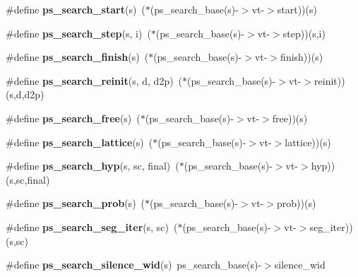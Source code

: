 \begin{DoxyCompactItemize}
\item 
\#define {\bfseries ps\+\_\+search\+\_\+start}(s)~($\ast$(ps\+\_\+search\+\_\+base(s)-\/$>$vt-\/$>$start))(s)\label{pocketsphinx__internal_8h_ac905db8dfa65727e787c44f40d80239c}

\item 
\#define {\bfseries ps\+\_\+search\+\_\+step}(s,  i)~($\ast$(ps\+\_\+search\+\_\+base(s)-\/$>$vt-\/$>$step))(s,i)\label{pocketsphinx__internal_8h_a3e3be8540f1e419fe4dfa1a063c4e8be}

\item 
\#define {\bfseries ps\+\_\+search\+\_\+finish}(s)~($\ast$(ps\+\_\+search\+\_\+base(s)-\/$>$vt-\/$>$finish))(s)\label{pocketsphinx__internal_8h_a52d4cf988efa2211c86a2168de346032}

\item 
\#define {\bfseries ps\+\_\+search\+\_\+reinit}(s,  d,  d2p)~($\ast$(ps\+\_\+search\+\_\+base(s)-\/$>$vt-\/$>$reinit))(s,d,d2p)\label{pocketsphinx__internal_8h_a071483ece6369091cc50334f5be1124b}

\item 
\#define {\bfseries ps\+\_\+search\+\_\+free}(s)~($\ast$(ps\+\_\+search\+\_\+base(s)-\/$>$vt-\/$>$free))(s)\label{pocketsphinx__internal_8h_ac5475853d99524bb4c933c42df58118b}

\item 
\#define {\bfseries ps\+\_\+search\+\_\+lattice}(s)~($\ast$(ps\+\_\+search\+\_\+base(s)-\/$>$vt-\/$>$lattice))(s)\label{pocketsphinx__internal_8h_ac821fb65e0c2ef778a4b8b49ecf30e11}

\item 
\#define {\bfseries ps\+\_\+search\+\_\+hyp}(s,  sc,  final)~($\ast$(ps\+\_\+search\+\_\+base(s)-\/$>$vt-\/$>$hyp))(s,sc,final)\label{pocketsphinx__internal_8h_a61247136ccf60cf65c19ecc9efebcb73}

\item 
\#define {\bfseries ps\+\_\+search\+\_\+prob}(s)~($\ast$(ps\+\_\+search\+\_\+base(s)-\/$>$vt-\/$>$prob))(s)\label{pocketsphinx__internal_8h_a3fb9e1a2036effd2f15cd088140c750f}

\item 
\#define {\bfseries ps\+\_\+search\+\_\+seg\+\_\+iter}(s,  sc)~($\ast$(ps\+\_\+search\+\_\+base(s)-\/$>$vt-\/$>$seg\+\_\+iter))(s,sc)\label{pocketsphinx__internal_8h_a6478039ec1ab5948ff19123c4464a5a4}

\item 
\#define {\bfseries ps\+\_\+search\+\_\+silence\+\_\+wid}(s)~ps\+\_\+search\+\_\+base(s)-\/$>$silence\+\_\+wid\label{pocketsphinx__internal_8h_aab989bd93fe7abcc165bc92d6ccc1bac}


\end{DoxyCompactItemize}
